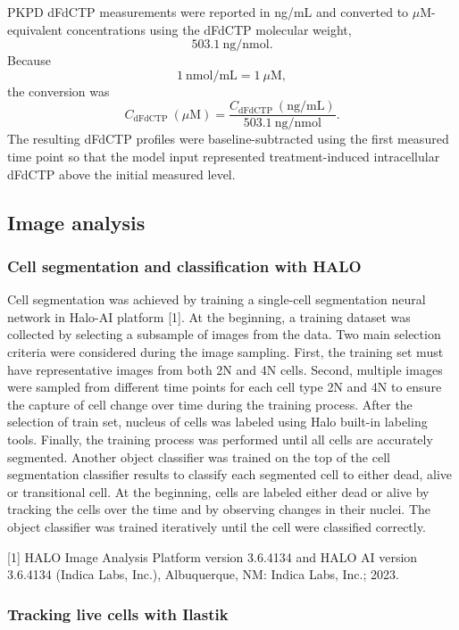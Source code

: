 \documentclass[11pt,notitlepage]{article}
\begin{document}
PKPD dFdCTP measurements were reported in ng/mL and converted to \(\mu\mathrm{M}\)-equivalent concentrations using the dFdCTP molecular weight,
\[
503.1~\mathrm{ng}/\mathrm{nmol}.
\]
Because
\[
1~\mathrm{nmol}/\mathrm{mL}=1~\mu\mathrm{M},
\]
the conversion was
\[
C_{\mathrm{dFdCTP}}~(\mu\mathrm{M})
=
\frac{C_{\mathrm{dFdCTP}}~(\mathrm{ng}/\mathrm{mL})}
{503.1~\mathrm{ng}/\mathrm{nmol}}.
\]
The resulting dFdCTP profiles were baseline-subtracted using the first measured time point so that the model input represented treatment-induced intracellular dFdCTP above the initial measured level.

\subsection*{Image analysis}
 \subsubsection*{Cell segmentation and classification with HALO}

Cell segmentation was achieved by training a single-cell segmentation neural network in Halo-AI platform [1]. At the beginning, a training dataset was collected by selecting a subsample of images from the data. Two main selection criteria were considered during the image sampling. First, the training set must have representative images from both 2N and 4N cells. Second, multiple images were sampled from different time points for each cell type 2N and 4N to ensure the capture of cell change over time during the training process. After the selection of train set, nucleus of cells was labeled using Halo built-in labeling tools. Finally, the training process was performed until all cells are accurately segmented. 
Another object classifier was trained on the top of the cell segmentation classifier results to classify each segmented cell to either dead, alive or transitional cell. At the beginning, cells are labeled either dead or alive by tracking the cells over the time and by observing changes in their nuclei. The object classifier was trained iteratively until the cell were classified correctly.

[1] HALO Image Analysis Platform version 3.6.4134 and HALO AI version 3.6.4134 (Indica Labs, Inc.), Albuquerque, NM: Indica Labs, Inc.; 2023.

\subsubsection*{Tracking live cells with Ilastik}
\end{document}
